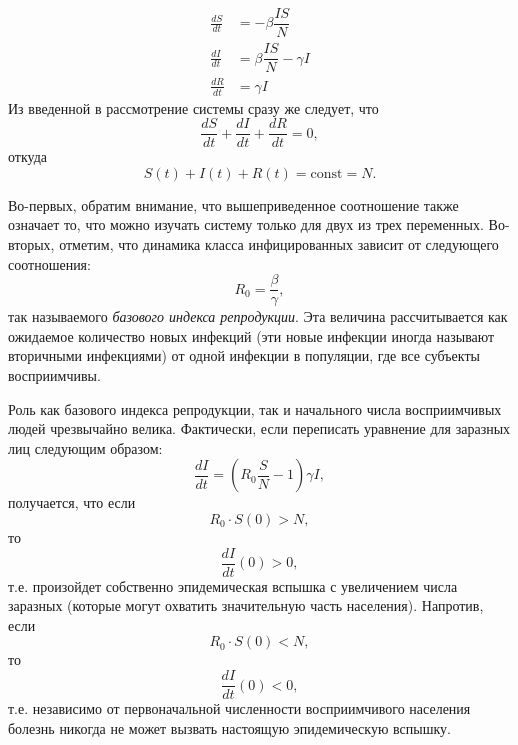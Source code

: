 \documentclass[12pt]{article}
\begin{document}
\begin{align}
    \frac{dS}{dt} &= - \beta \dfrac{IS}{N} \\
    \frac{dI}{dt} &= \beta \dfrac{IS}{N} - \gamma I \\
    \frac{dR}{dt} &= \gamma I
\end{align}
Из введенной в рассмотрение системы сразу же следует, что
\begin{equation}
    \frac{dS}{dt} + \frac{dI}{dt} + \frac{dR}{dt} = 0,
\end{equation}
откуда
\begin{equation}
    S(t) + I(t) + R(t) = \mathrm{const} = N.
\end{equation}

Во-первых, обратим внимание, что вышеприведенное соотношение также означает то, что можно изучать систему только для двух из трех переменных. Во-вторых, отметим, что динамика класса инфицированных зависит от следующего соотношения:
\begin{equation}
    R_0 = \dfrac{\beta}{\gamma},
\end{equation}
так называемого \textit{базового индекса репродукции}. Эта величина рассчитывается как ожидаемое количество новых инфекций (эти новые инфекции иногда называют вторичными инфекциями) от одной инфекции в популяции, где все субъекты восприимчивы.

Роль как базового индекса репродукции, так и начального числа восприимчивых людей чрезвычайно велика. Фактически, если переписать уравнение для заразных лиц следующим образом:
\begin{equation*}
    \dfrac{dI}{dt} = \left( R_0 \dfrac{S}{N} - 1 \right) \gamma I,
\end{equation*}
получается, что если 
\begin{equation*}
    R_0 \cdot S(0) > N,
\end{equation*}
то
\begin{equation*}
    \dfrac{dI}{dt}(0) > 0,
\end{equation*}
т.е. произойдет собственно эпидемическая вспышка с увеличением числа заразных (которые могут охватить значительную часть населения). Напротив, если
\begin{equation*}
    R_0 \cdot S(0) < N,
\end{equation*}
то
\begin{equation*}
    \dfrac{dI}{dt}(0) < 0,
\end{equation*}
т.е. независимо от первоначальной численности восприимчивого населения болезнь никогда не может вызвать настоящую эпидемическую вспышку.
\end{document}

